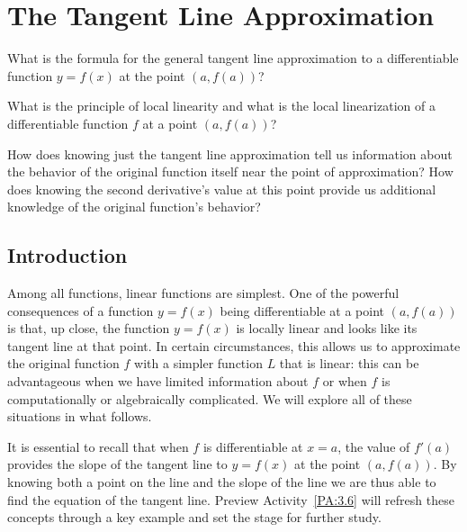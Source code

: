 \section{The Tangent Line Approximation} \label{S:3.6.LinApprox}

\begin{goals}
\item What is the formula for the general tangent line approximation to a differentiable function $y = f(x)$ at the point $(a,f(a))$?
\item What is the principle of local linearity and what is the local linearization of a differentiable function $f$ at a point $(a,f(a))$?
\item How does knowing just the tangent line approximation tell us information about the behavior of the original function itself near the point of approximation?  How does knowing the second derivative's value at this point provide us additional knowledge of the original function's behavior?
\end{goals}

\subsection*{Introduction}

Among all functions, linear functions are simplest.  One of the powerful consequences of a function $y = f(x)$ being differentiable at a point $(a,f(a))$ is that, up close, the function $y = f(x)$ is locally linear and looks like its tangent line at that point.  In certain circumstances, this allows us to approximate the original function $f$ with a simpler function $L$ that is linear: this can be advantageous when we have limited information about $f$ or when $f$ is computationally or algebraically complicated.  We will explore all of these situations in what follows.

It is essential to recall that when $f$ is differentiable at $x = a$, the value of $f'(a)$ provides the slope of the tangent line to $y = f(x)$ at the point $(a,f(a))$.  By knowing both a point on the line and the slope of the line we are thus able to find the equation of the tangent line.  Preview Activity~\ref{PA:3.6} will refresh these concepts through a key example and set the stage for further study.


